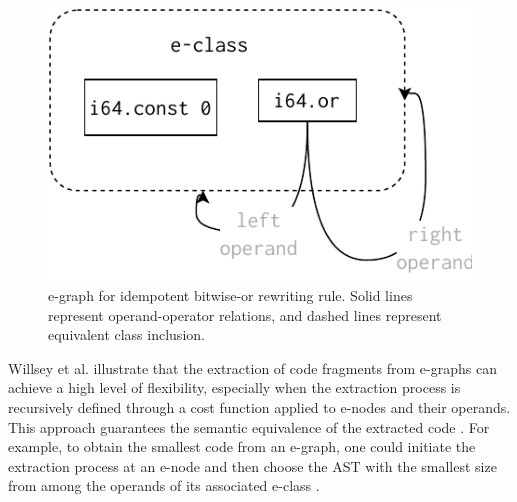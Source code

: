 \begin{figure}
    \centering
    \includegraphics[width=0.5\linewidth]{figures/egraph1.pdf}
    \caption{e-graph for idempotent bitwise-or rewriting rule. Solid lines represent operand-operator relations, and dashed lines represent equivalent class inclusion. }
  \label{e-graph}
\end{figure}




Willsey et al. illustrate that the extraction of code fragments from e-graphs can achieve a high level of flexibility, especially when the extraction process is recursively defined through a cost function applied to e-nodes and their operands. 
This approach guarantees the semantic equivalence of the extracted code \cite{10.1145/3434304}. 
For example, to obtain the smallest code from an e-graph, one could initiate the extraction process at an e-node and then choose the AST with the smallest size from among the operands of its associated e-class \cite{10.1145/3385412.3386012}.

